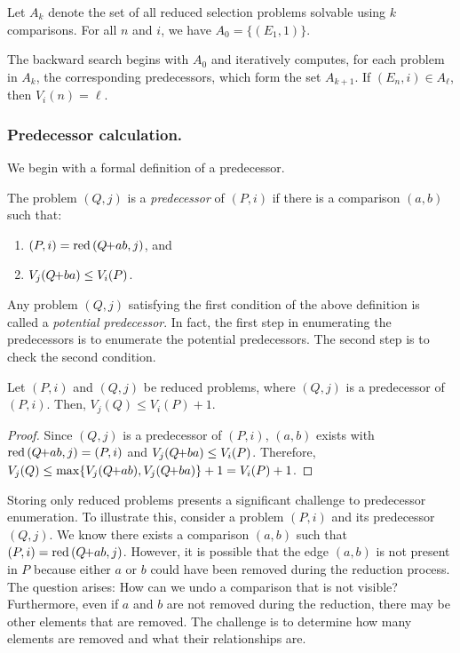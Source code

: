 \documentclass[a4paper,UKenglish,cleveref, autoref, thm-restate]{lipics-v2021}
\newcommand{\pchild}[3]{{#1}\kern-1pt{+}{#2}{#3}}
\newcommand{\reduced}[1]{\operatorname{red}{#1}}
\begin{document}
Let $A_k$ denote the set of all reduced selection problems solvable using $k$ comparisons.
For all $n$ and $i$, we have $A_0 = \{(E_1, 1)\}$.

The backward search begins with $A_0$ and iteratively computes, for each problem in $A_k$, the corresponding predecessors, which form the set $A_{k + 1}$.
If $(E_n, i) \in A_\ell$, then $V_i(n) = \ell$.

\subsubsection{Predecessor calculation.} \label{sec:backward:predecessor_calculation}
We begin with a formal definition of a predecessor.

\begin{definition}[Predecessor] \label{definition:predecessor_calculation}
  The problem $(Q, j)$ is a \emph{predecessor} of $(P, i)$ if there is a comparison $(a, b)$ such that:
  \begin{enumerate}
    \item $(P, i) = \reduced(\pchild{Q}{a}{b}, j)$, and
    \item $V_j(\pchild{Q}{b}{a}) \leq V_i(P)$.
  \end{enumerate}
\end{definition}

Any problem $(Q, j)$ satisfying the first condition of the above definition is called a \emph{potential predecessor}.
In fact, the first step in enumerating the predecessors is to enumerate the potential predecessors.
The second step is to check the second condition.

\begin{lemma} \label{lemma:predecessor_calculation}
  Let $(P, i)$ and $(Q, j)$ be reduced problems, where $(Q, j)$ is a predecessor of $(P, i)$.
  Then, $V_j(Q) \leq V_i(P) + 1$.
\end{lemma}

\begin{proof} \label{proof:predecessor_calculation}
  Since $(Q, j)$ is a predecessor of $(P, i)$, $(a, b)$ exists with $\reduced{(\pchild{Q}{a}{b}, j)} = (P, i)$ and $V_j(\pchild{Q}{b}{a}) \leq V_i(P)$.
  Therefore, $V_j(Q) \leq \max\{V_j(\pchild{Q}{a}{b}), V_j(\pchild{Q}{b}{a})\} + 1 = V_i(P) + 1$.
\end{proof}

Storing only reduced problems presents a significant challenge to predecessor enumeration.
To illustrate this, consider a problem $(P, i)$ and its predecessor $(Q, j)$.
We know there exists a comparison $(a, b)$ such that $(P, i) = \reduced(\pchild{Q}{a}{b}, j)$.
However, it is possible that the edge $(a, b)$ is not present in $P$ because either $a$ or $b$ could have been removed during the reduction process.
The question arises: How can we undo a comparison that is not visible?
Furthermore, even if $a$ and $b$ are not removed during the reduction, there may be other elements that are removed.
The challenge is to determine how many elements are removed and what their relationships are.
\end{document}
